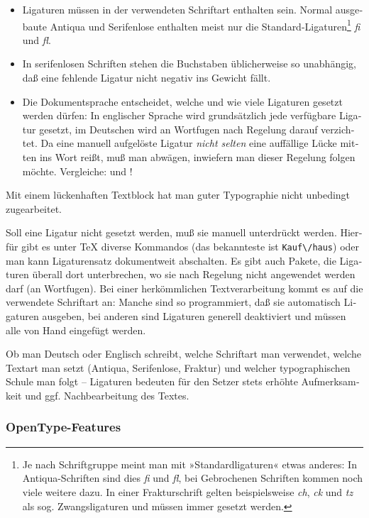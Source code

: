 \documentclass[11pt,a4paper,ngerman,french,DIV=8]{scrartcl}
\begin{document}
\begin{otherlanguage}{ngerman}
\begin{itemize}
  \item Ligaturen müssen in der verwendeten Schriftart enthalten sein. Normal ausgebaute Antiqua und Serifenlose enthalten meist nur die Standard-Ligaturen\footnote{Je nach Schriftgruppe meint man mit »Standardligaturen« etwas anderes: In Antiqua-Schriften sind dies \emph{fi} und \emph{fl}, bei Gebrochenen Schriften kommen noch viele weitere dazu. In einer Frakturschrift gelten beispielsweise \emph{ch}, \emph{ck} und \emph{tz} als sog. Zwangsligaturen und müssen immer gesetzt werden.} \emph{fi} und \emph{fl}.
  \item In serifenlosen Schriften stehen die Buchstaben üblicherweise so unabhängig, daß eine fehlende Ligatur nicht negativ ins Gewicht fällt.
  \item Die Dokumentsprache entscheidet, welche und wie viele Ligaturen gesetzt werden dürfen: In englischer Sprache wird grundsätzlich jede verfügbare Ligatur gesetzt, im Deutschen wird an Wortfugen nach Regelung darauf verzichtet. Da eine manuell aufgelöste Ligatur \emph{nicht selten} eine auffällige Lücke mitten ins Wort reißt, muß man abwägen, inwiefern man dieser Regelung folgen möchte. Vergleiche:  und  !
\end{itemize}
Mit einem lückenhaften Textblock hat man guter Typographie nicht unbedingt zugearbeitet.

Soll eine Ligatur nicht gesetzt werden, muß sie manuell unterdrückt werden. Hierfür gibt es unter \TeX{} diverse Kommandos (das bekannteste ist \texttt{Kauf\textbackslash/haus}) oder man kann Ligaturensatz dokumentweit abschalten. Es gibt auch Pakete, die Ligaturen überall dort unterbrechen, wo sie nach Regelung nicht angewendet werden darf (an Wortfugen). Bei einer herkömmlichen Textverarbeitung kommt es auf die verwendete Schriftart an: Manche sind so programmiert, daß sie automatisch Ligaturen ausgeben, bei anderen sind Ligaturen generell deaktiviert und müssen alle von Hand eingefügt werden.

Ob man Deutsch oder Englisch schreibt, welche Schriftart man verwendet, welche Textart man setzt (Antiqua, Serifenlose, Fraktur) und welcher typographischen Schule man folgt -- Ligaturen bedeuten für den Setzer stets erhöhte Aufmerksamkeit und ggf. Nachbearbeitung des Textes.

\subsubsection{OpenType-Features}


\end{otherlanguage}
\end{document}
